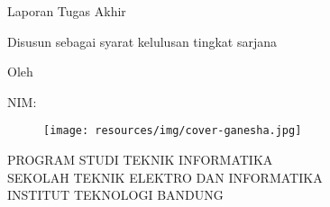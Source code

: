 \clearpage
\pagestyle{empty}

\begin{center}
\smallskip

    \large \bfseries \MakeUppercase{\thetitle}
    \vfill

    \large Laporan Tugas Akhir
    \vfill

    \normalsize Disusun sebagai syarat kelulusan tingkat sarjana
    \vfill

    \normalsize Oleh

    \large \theauthor

    \large NIM: \thestudentnumber

    \vfill
    \begin{figure}[h]
        \centering
      	\texttt{[image: resources/img/cover-ganesha.jpg]}
    \end{figure}
    \vfill

    \large
    \uppercase{
        Program Studi Teknik Informatika \\
        Sekolah Teknik Elektro dan Informatika \\
        Institut Teknologi Bandung \\
        \thedatemy
    }

\end{center}

\clearpage
